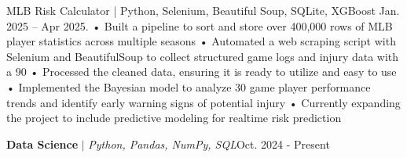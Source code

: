 MLB Risk Calculator | Python, Selenium, Beautiful Soup, SQLite, XGBoost Jan. 2025 – Apr 2025.
• Built a pipeline to sort and store over 400,000 rows of MLB player statistics across multiple seasons
• Automated a web scraping script with Selenium and BeautifulSoup to collect structured game logs and injury data
with a 90%
• Processed the cleaned data, ensuring it is ready to utilize and easy to use
• Implemented the Bayesian model to analyze 30 game player performance trends and identify early warning signs of
potential injury
• Currently expanding the project to include predictive modeling for realtime risk prediction

    \resumeProjectHeading
          {\textbf{Data Science } $|$ \emph{Python, Pandas, NumPy, SQL}}{Oct. 2024 - Present }
          \resumeItemListStart
          \resumeItemListEnd